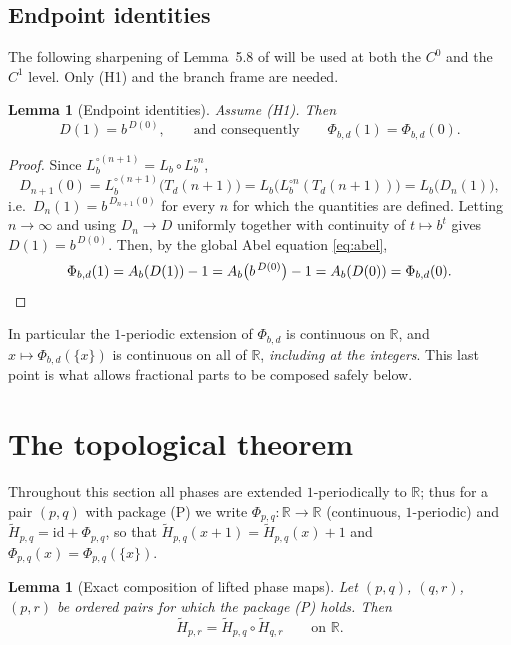 \documentclass[11pt]{article}
\newtheorem{lemma}[theorem]{Lemma}
\theoremstyle{definition}
\theoremstyle{remark}
\newcommand{\R}{\mathbb{R}}
\newcommand{\Lb}{L_{b}}
\newcommand{\Ab}{A_{b}}
\newcommand{\Td}{T_{d}}
\newcommand{\frc}[1]{\{#1\}}
\newcommand{\Ht}{\widetilde H}
\begin{document}
\subsection{Endpoint identities}
The following sharpening of Lemma~5.8 of \cite{J} will be used at both
the $C^{0}$ and the $C^{1}$ level. Only (H1) and the branch frame are
needed.

\begin{lemma}[Endpoint identities]\label{lem:endpoint}
Assume \textup{(H1)}. Then
\begin{equation}\label{eq:D1}
D(1)=b^{\,D(0)},
\qquad\text{and consequently}\qquad
\Phi_{b,d}(1)=\Phi_{b,d}(0).
\end{equation}
\end{lemma}

\begin{proof}
Since $\Lb^{\circ(n+1)}=\Lb\circ\Lb^{\circ n}$,
\[
D_{n+1}(0)=\Lb^{\circ(n+1)}\big(\Td(n+1)\big)
=\Lb\big(\Lb^{\circ n}(\Td(n+1))\big)=\Lb\big(D_n(1)\big),
\]
i.e.\ $D_n(1)=b^{\,D_{n+1}(0)}$ for every $n$ for which the quantities are
defined. Letting $n\to\infty$ and using $D_n\to D$ uniformly together with
continuity of $t\mapsto b^{t}$ gives $D(1)=b^{\,D(0)}$. Then, by the global
Abel equation \eqref{eq:abel},
\[
\Phi_{b,d}(1)=\Ab(D(1))-1=\Ab\big(b^{\,D(0)}\big)-1=\Ab(D(0))=\Phi_{b,d}(0).
\qedhere
\]
\end{proof}

In particular the $1$-periodic extension of $\Phi_{b,d}$ is continuous on
$\R$, and $x\mapsto\Phi_{b,d}(\frc{x})$ is continuous on all of $\R$,
\emph{including at the integers}. This last point is what allows
fractional parts to be composed safely below.

\section{The topological theorem}\label{sec:topo}

Throughout this section all phases are extended $1$-periodically to
$\R$; thus for a pair $(p,q)$ with package (P) we write
$\Phi_{p,q}:\R\to\R$ (continuous, $1$-periodic) and
$\Ht_{p,q}=\mathrm{id}+\Phi_{p,q}$, so that
$\Ht_{p,q}(x+1)=\Ht_{p,q}(x)+1$ and $\Phi_{p,q}(x)=\Phi_{p,q}(\frc x)$.

\begin{lemma}[Exact composition of lifted phase maps]\label{lem:comp}
Let $(p,q)$, $(q,r)$, $(p,r)$ be ordered pairs for which the package
\textup{(P)} holds. Then
\[
\Ht_{p,r}=\Ht_{p,q}\circ\Ht_{q,r}
\qquad\text{on }\R .
\]
\end{lemma}
\end{document}
